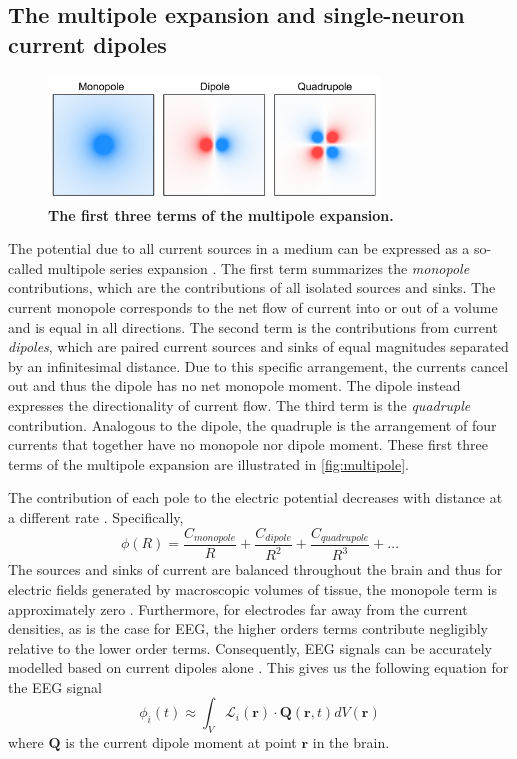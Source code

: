 \subsection{The multipole expansion and single-neuron current dipoles}

\begin{figure}
\vspace{-17pt}
\centering
\includegraphics[width=88mm]{Figures/chapter1/multipole_expansion.pdf}
\vspace{-22pt}
\caption{\textbf{The first three terms of the multipole expansion.}}  \label{fig:multipole}
\end{figure}

The potential due to all current sources in a medium can be expressed as a so-called multipole series expansion \cite{Nunez2006}. The first term summarizes the \textit{monopole} contributions, which are the contributions of all isolated sources and sinks. The current monopole corresponds to the net flow of current into or out of a volume and is equal in all directions. The second term is the contributions from current \textit{dipoles}, which are paired current sources and sinks of equal magnitudes separated by an infinitesimal distance. Due to this specific arrangement, the currents cancel out and thus the dipole has no net monopole moment. The dipole instead expresses the directionality of current flow. The third term is the \textit{quadruple} contribution. Analogous to the dipole, the quadruple is the arrangement of four currents that together have no monopole nor dipole moment. These first three terms of the multipole expansion are illustrated in \autoref{fig:multipole}. 

The contribution of each pole to the electric potential decreases with distance at a different rate \cite{Nunez2006}. Specifically,
\begin{equation*}
    \phi(R) = \frac{C_{monopole}}{R} + \frac{C_{dipole}}{R^2}  + \frac{C_{quadrupole}}{R^3}  + \dots
\end{equation*}
The sources and sinks of current are balanced throughout the brain and thus for electric fields generated by macroscopic volumes of tissue, the monopole term is approximately zero \cite{Nunez2006}. Furthermore, for electrodes far away from the current densities, as is the case for EEG, the higher orders terms contribute negligibly relative to the lower order terms. Consequently, EEG signals can be accurately modelled based on current dipoles alone \cite{Nunez2006,RevModPhys.65.413}. This gives us the following equation for the EEG signal \cite{RevModPhys.65.413}
\begin{equation} \label{eq:lead_solution}
    \phi_i(t) \approx \int_V \mathcal{L}_i(\bm{r}) \cdot \bm{Q}(\bm{r},t) dV(\bm{r})
\end{equation}
where $\bm{Q}$ is the current dipole moment at point $\bm{r}$ in the brain. 

